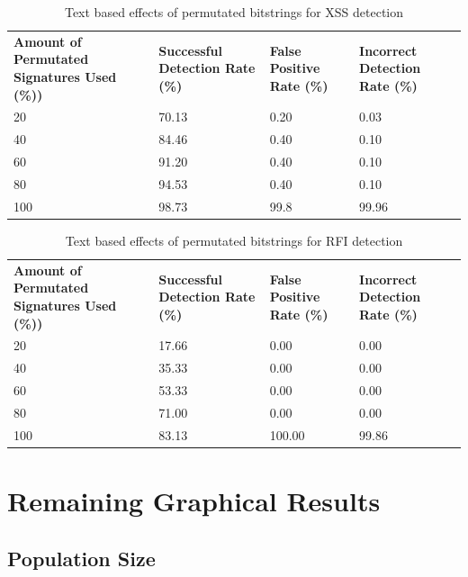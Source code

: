 \begin{appendices}
\begin{table}[H]
	\centering
	\begin{tabular}{|p{1.5in}|p{1in}|p{1in}|p{1in}|}
	\hline
	\textbf{Amount of Permutated Signatures Used (\%))} & \textbf{Successful Detection Rate (\%)} & \textbf{False Positive Rate (\%)} & \textbf{Incorrect Detection Rate (\%)}  \\
	\hhline{|=|=|=|=|}
	20	& 70.13	& 0.20 &	0.03 \\ \hline
	40	& 84.46 & 0.40 &	0.10 \\ \hline
	60	& 91.20	& 0.40 &	0.10 \\ \hline
	80	& 94.53 & 0.40 & 0.10 \\ \hline
	100	& 98.73 & 99.8 & 99.96 \\ \hline
	\end{tabular}
	\caption{Text based effects of permutated bitstrings for XSS detection}
\end{table}

\begin{table}[H]
	\centering
	\begin{tabular}{|p{1.5in}|p{1in}|p{1in}|p{1in}|}
	\hline
	\textbf{Amount of Permutated Signatures Used (\%))} & \textbf{Successful Detection Rate (\%)} & \textbf{False Positive Rate (\%)} & \textbf{Incorrect Detection Rate (\%)}  \\
	\hhline{|=|=|=|=|}
	20	& 17.66	& 0.00 &	0.00 \\ \hline
	40	& 35.33 & 0.00 &	0.00 \\ \hline
	60	& 53.33	& 0.00 &	0.00 \\ \hline
	80	& 71.00 & 0.00 & 0.00 \\ \hline
	100	& 83.13 & 100.00 & 99.86 \\ \hline
	\end{tabular}
	\caption{Text based effects of permutated bitstrings for RFI detection}
\end{table}

\newpage
\section{Remaining Graphical Results}
\subsection{Population Size} \label{app:resPopulation}


\end{appendices}

